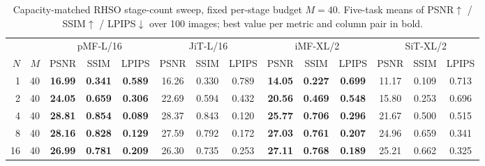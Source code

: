 \begin{table}[t]
\centering
\small
\setlength{\tabcolsep}{4pt}
\caption{Capacity-matched RHSO stage-count sweep, fixed per-stage budget $M = 40$. Five-task means of PSNR$\uparrow$ / SSIM$\uparrow$ / LPIPS$\downarrow$ over 100 images; best value per metric and column pair in bold.}
\label{tab:capacity_fixedM}
\begin{tabular}{rrcccccccccccc}
\toprule
& & \multicolumn{3}{c}{pMF-L/16} & \multicolumn{3}{c}{JiT-L/16} & \multicolumn{3}{c}{iMF-XL/2} & \multicolumn{3}{c}{SiT-XL/2} \\
\cmidrule(lr){3-5} \cmidrule(lr){6-8} \cmidrule(lr){9-11} \cmidrule(lr){12-14}
$N$ & $M$ & PSNR & SSIM & LPIPS & PSNR & SSIM & LPIPS & PSNR & SSIM & LPIPS & PSNR & SSIM & LPIPS \\
\midrule
1 & 40 & \textbf{16.99} & \textbf{0.341} & \textbf{0.589} & 16.26 & 0.330 & 0.789 & \textbf{14.05} & \textbf{0.227} & \textbf{0.699} & 11.17 & 0.109 & 0.713 \\
2 & 40 & \textbf{24.05} & \textbf{0.659} & \textbf{0.306} & 22.69 & 0.594 & 0.432 & \textbf{20.56} & \textbf{0.469} & \textbf{0.548} & 15.80 & 0.253 & 0.696 \\
4 & 40 & \textbf{28.81} & \textbf{0.854} & \textbf{0.089} & 28.37 & 0.843 & 0.120 & \textbf{25.77} & \textbf{0.706} & \textbf{0.296} & 21.67 & 0.500 & 0.515 \\
8 & 40 & \textbf{28.16} & \textbf{0.828} & \textbf{0.129} & 27.59 & 0.792 & 0.172 & \textbf{27.03} & \textbf{0.761} & \textbf{0.207} & 24.96 & 0.659 & 0.341 \\
16 & 40 & \textbf{26.99} & \textbf{0.781} & \textbf{0.209} & 26.30 & 0.735 & 0.253 & \textbf{27.11} & \textbf{0.768} & \textbf{0.189} & 25.21 & 0.662 & 0.325 \\
\bottomrule
\end{tabular}
\end{table}

